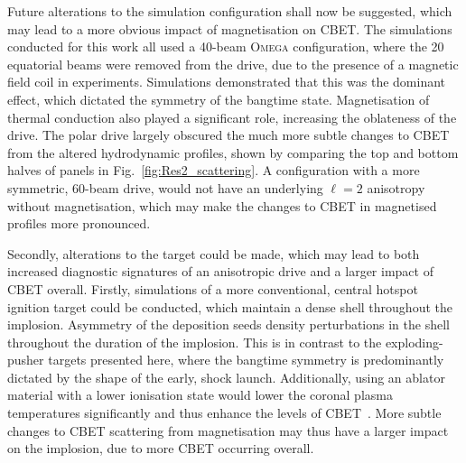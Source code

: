 Future alterations to the simulation configuration shall now be suggested, which may lead to a more obvious impact of magnetisation on \ac{CBET}.
The simulations conducted for this work all used a 40-beam \textsc{Omega} configuration, where the 20 equatorial beams were removed from the drive, due to the presence of a magnetic field coil in experiments.
Simulations demonstrated that this was the dominant effect, which dictated the symmetry of the bangtime state.
Magnetisation of thermal conduction also played a significant role, increasing the oblateness of the drive.
The polar drive largely obscured the much more subtle changes to \ac{CBET} from the altered hydrodynamic profiles, shown by comparing the top and bottom halves of panels in Fig.~\ref{fig:Res2_scattering}.
A configuration with a more symmetric, 60-beam drive, would not have an underlying $\ell=2$ anisotropy without magnetisation, which may make the changes to \ac{CBET} in magnetised profiles more pronounced.

Secondly, alterations to the target could be made, which may lead to both increased diagnostic signatures of an anisotropic drive and a larger impact of \ac{CBET} overall.
Firstly, simulations of a more conventional, central hotspot ignition target could be conducted, which maintain a dense shell throughout the implosion.
Asymmetry of the deposition seeds density perturbations in the shell throughout the duration of the implosion.
This is in contrast to the exploding-pusher targets presented here, where the bangtime symmetry is predominantly dictated by the shape of the early, shock launch.
Additionally, using an ablator material with a lower ionisation state would lower the coronal plasma temperatures significantly and thus enhance the levels of \ac{CBET}~\cite{colaitis_exploration_2023}.
More subtle changes to \ac{CBET} scattering from magnetisation may thus have a larger impact on the implosion, due to more \ac{CBET} occurring overall.
